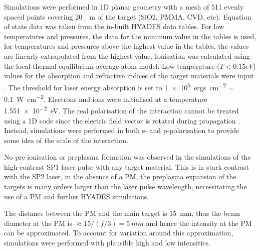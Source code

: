 Simulations were performed in 1D planar geometry with a mesh of 511 evenly spaced points covering \qty{20}{\mu m} of the target (SiO2, PMMA, CVD, etc). Equation of state data was taken from the in-built HYADES data tables. For low temperatures and pressures, the data for the minimum value in the tables is used, for temperatures and pressures above the highest value in the tables, the values are linearly extrapolated from the highest value. Ionisation was calculated using the local thermal equilibrium average atom model. Low temperature ($T < 0.15 eV$) values for the absorption and refractive indices of the target materials were input \cite{polyanskiyRefractiveindexInfoDatabase2024}.
The threshold for laser energy absorption is set to \qty{1e6}{ergs.cm^{-2}} = \qty{0.1}{W.cm^{-2}}. Electrons and ions were initialised at a temperature \qty{1.551e-2}{eV}. The real polarisation of the interaction cannot be treated using a 1D code since the electric field vector is rotated during propagation \cite{larsenQuestionSourceWave2023}. Instead, simulations were performed in both s- and p-polarisation to provide some idea of the scale of the interaction.

No pre-ionisation or preplasma formation was observed in the simulations of the high-contrast SP1 laser pulse with any target material. This is in stark contrast with the SP2 laser, in the absence of a PM, the preplasma expansion of the targets is many orders larger than the laser pulse wavelength, necessitating the use of a PM and further HYADES simulations.

The distance between the PM and the main target is \qty{15}{mm}, thus the beam diameter at the PM is $\approx 15/(f/3) = \qty{5}{mm}$ and hence the intensity at the PM can be approximated. To account for variation around this approximation, simulations were performed with plausible high and low intensities.

